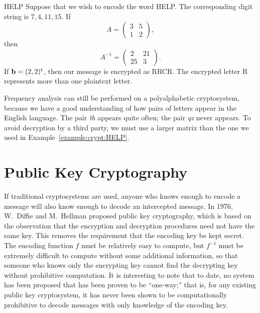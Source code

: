  
\begin{example}{HELP}
Suppose that we wish to encode the word HELP. The corresponding
digit string is $7, 4, 11, 15$. If
\[
A =
\begin{pmatrix}
3 & 5 \\
1 & 2
\end{pmatrix},
\]
then
\[
A^{-1} 
=
\begin{pmatrix}
2 & 21 \\
25 & 3
\end{pmatrix}.
\]
If ${\mathbf b} = ( 2, 2)^{\rm t}$, then our message is encrypted as
RRCR. The encrypted letter R represents more than one plaintext
letter. 
\end{example}
 
 
Frequency analysis can still be performed on a polyalphabetic
cryptosystem, because we have a good understanding of how pairs of
letters appear in the English language. The pair {\em th} appears
quite often; the pair {\em qz} never appears.  To avoid decryption by
a third party, we must use a larger matrix than the one we used in
Example~\ref{example:crypt:HELP}. 


  
 
 
\section{Public Key Cryptography}
 
 
 
If traditional cryptosystems are used, anyone who knows enough to
encode a message will also know enough to decode an intercepted
message. In 1976, W.~Diffie and
M.~Hellman proposed public key cryptography, which
is based on the observation that the encryption and decryption
procedures need not have the same key. This removes the requirement
that the encoding key be kept secret. The encoding function $f$ must
be relatively easy to compute, but $f^{-1}$ must be extremely
difficult to compute without some additional information, so that
someone who knows only the encrypting key cannot find the decrypting
key without prohibitive computation. It is interesting to note that to
date, no system has been proposed that has been proven to be
``one-way;'' that is, for any existing public key cryptosystem, it has
never been shown to be computationally prohibitive to decode messages
with only knowledge of the encoding key. 
 
 
 
